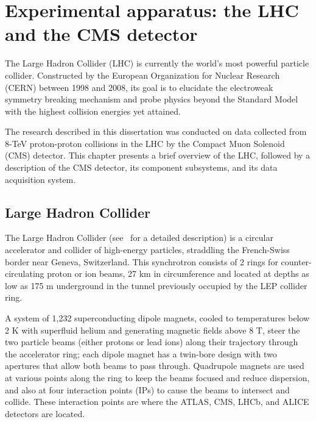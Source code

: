 \chapter{Experimental apparatus: the LHC and the CMS detector\label{sec:experiment}}

The Large Hadron Collider (LHC) is currently the world's most powerful particle collider. Constructed by the European Organization for Nuclear Research (CERN) between 1998 and 2008, its goal is to elucidate the electroweak symmetry breaking mechanism and probe physics beyond the Standard Model with the highest collision energies yet attained.

The research described in this dissertation was conducted on data collected from 8-TeV proton-proton collisions in the LHC by the Compact Muon Solenoid (CMS) detector. This chapter presents a brief overview of the LHC, followed by a description of the CMS detector, its component subsystems, and its data acquisition system.

\section{Large Hadron Collider\label{sec:lhc}}

The Large Hadron Collider (see~\cite{1748-0221-3-08-S08001} for a detailed description) is a circular accelerator and collider of high-energy particles, straddling the French-Swiss border near Geneva, Switzerland. This synchrotron consists of 2 rings for counter-circulating proton or ion beams, 27 km in circumference and located at depths as low as 175 m underground in the tunnel previously occupied by the LEP collider ring.

A system of 1,232 superconducting dipole magnets, cooled to temperatures below 2 K with superfluid helium and generating magnetic fields above 8 T, steer the two particle beams (either protons or lead ions) along their trajectory through the accelerator ring; each dipole magnet has a twin-bore design with two apertures that allow both beams to pass through. Quadrupole magnets are used at various points along the ring to keep the beams focused and reduce dispersion, and also at four interaction points (IPs) to cause the beams to intersect and collide. These interaction points are where the ATLAS, CMS, LHCb, and ALICE detectors are located.

